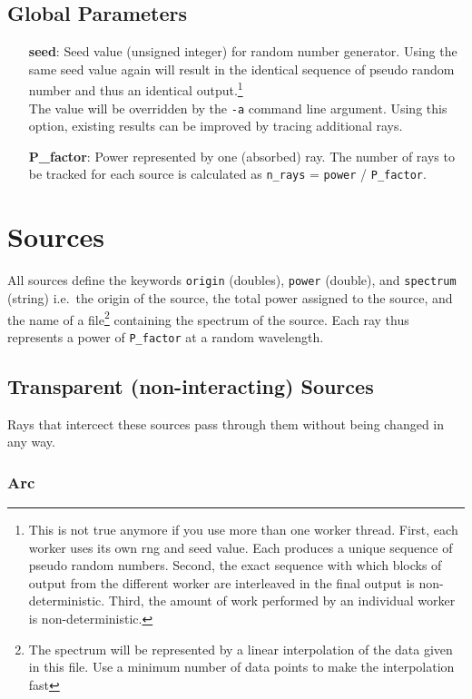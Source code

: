 \documentclass[10pt,a4paper,titlepage]{article}
\begin{document}
\subsection{Global Parameters}
\begin{itemize}
\item[{\bf seed}:]{Seed value (unsigned integer) for random number generator. Using the same seed value again will result in the identical sequence of pseudo random number and thus an identical output.\footnote{This is not true anymore if you use more than one worker thread. First, each worker uses its own rng and seed value. Each produces a unique sequence of pseudo random numbers. Second, the exact sequence with which blocks of output from the different worker are interleaved in the final output is non-deterministic. Third, the amount of work performed by an individual worker is non-deterministic.}\\
The value will be overridden by the {\tt -a} command line argument. Using this option, existing results can be improved by tracing additional rays.}
\item[{\bf P\_factor}:]{Power represented by one (absorbed) ray. The number of rays to be tracked for each source is calculated as {\tt n\_rays} = {\tt power} / {\tt P\_factor}.}
\end{itemize}



\section{Sources}

All sources define the keywords {\tt origin} (doubles), {\tt power} (double), and {\tt spectrum} (string) i.e.\ the origin of the source, the total power assigned to the source, and the name of a file\footnote{The spectrum will be represented by a linear interpolation of the data given in this file. Use a minimum number of data points to make the interpolation fast} containing the spectrum of the source. Each ray thus represents a power of {\tt P\_factor} at a random wavelength.

\subsection{Transparent (non-interacting) Sources}

Rays that intercect these sources pass through them without being changed in any way.

\subsubsection{Arc}
\end{document}
